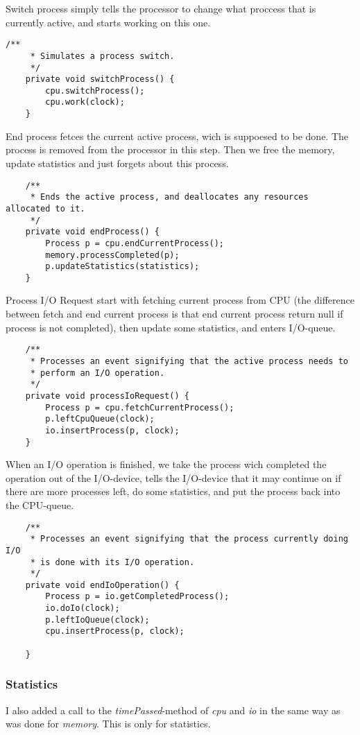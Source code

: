 \documentclass[norsk,a4paper]{article}
\begin{document}
Switch process simply tells the processor to change what
proccess that is currently active, and starts working on this one. 

\begin{lstlisting}
/**
     * Simulates a process switch.
     */
    private void switchProcess() {
        cpu.switchProcess();
        cpu.work(clock);
    }
\end{lstlisting}
End process fetces the current active process, wich is suppoesed to be done. The
process is removed from the processor in this step. Then we free the memory,
update statistics and just forgets about this process.
\begin{lstlisting}
    /**
     * Ends the active process, and deallocates any resources allocated to it.
     */
    private void endProcess() {
        Process p = cpu.endCurrentProcess();
        memory.processCompleted(p);
        p.updateStatistics(statistics);
    }
\end{lstlisting}
Process I/O Request start with fetching current process from CPU (the
difference between fetch and end current process is that end current process
return null if process is not completed), then update some statistics, and
enters I/O-queue.
\begin{lstlisting}
    /**
     * Processes an event signifying that the active process needs to
     * perform an I/O operation.
     */
    private void processIoRequest() {
        Process p = cpu.fetchCurrentProcess();
        p.leftCpuQueue(clock);
        io.insertProcess(p, clock);
    }
\end{lstlisting}
When an I/O operation is finished, we take the process wich completed the
operation out of the I/O-device, tells the I/O-device that it may continue on if
there are more processes left, do some statistics, and put the process back
into the CPU-queue.
\begin{lstlisting}
    /**
     * Processes an event signifying that the process currently doing I/O
     * is done with its I/O operation.
     */
    private void endIoOperation() {
        Process p = io.getCompletedProcess();
        io.doIo(clock);
        p.leftIoQueue(clock);
        cpu.insertProcess(p, clock);
        
    }
\end{lstlisting}

\subsubsection{Statistics}
I also added a call to the \emph{timePassed}-method of \emph{cpu} and \emph{io}
in the same way as was done for \emph{memory}. This is only for statistics.
\end{document}
